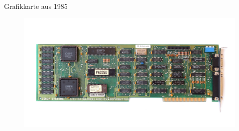 \documentclass[10pt,aspectratio=169]{beamer}
\begin{document}
\begin{frame}{Grafikkarte aus 1985}
    \begin{figure}[ht]
        \begin{center}
            \includegraphics[width=0.9\linewidth]{KL_Genoa_EGA.jpg}
        \end{center}
    \end{figure}
\end{frame}
\end{document}
